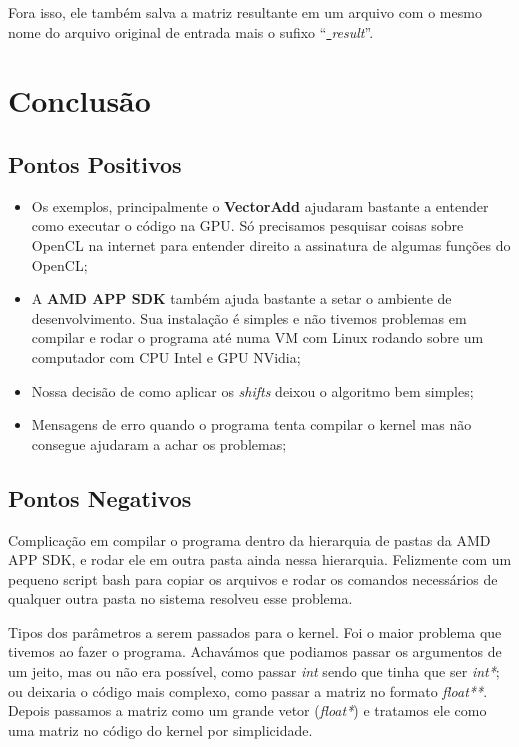 Fora isso, ele também salva a matriz resultante em um arquivo com o mesmo nome do arquivo original de entrada mais
o sufixo \textquotedblleft\textit{\underline{ }result}\textquotedblright.

\section{Conclusão}
\subsection{Pontos Positivos}
\begin{itemize}
  \item Os exemplos, principalmente o \textbf{VectorAdd} ajudaram bastante a entender como executar o código na GPU.
        Só precisamos pesquisar coisas sobre OpenCL na internet para entender direito a assinatura de algumas funções
        do OpenCL;
  \item A \textbf{AMD APP SDK} também ajuda bastante a setar o ambiente de desenvolvimento. Sua instalação é simples
        e não tivemos problemas em compilar e rodar o programa até numa VM com Linux rodando sobre um computador com
        CPU Intel e GPU NVidia;
  \item Nossa decisão de como aplicar os \textit{shifts} deixou o algoritmo bem simples;
  \item Mensagens de erro quando o programa tenta compilar o kernel mas não consegue ajudaram a achar os problemas;
\end{itemize}

\subsection{Pontos Negativos}
Complicação em compilar o programa dentro da hierarquia de pastas da AMD APP SDK, e rodar ele em outra pasta
ainda nessa hierarquia. Felizmente com um pequeno script bash para copiar os arquivos e rodar os comandos
necessários de qualquer outra pasta no sistema resolveu esse problema.

Tipos dos parâmetros a serem passados para o kernel. Foi o maior problema que tivemos ao fazer o programa. Achavámos
que podiamos passar os argumentos de um jeito, mas ou não era possível, como passar \textit{int} sendo que tinha que
ser \textit{int*}; ou deixaria o código mais complexo, como passar a matriz no formato \textit{float**}. Depois
passamos a matriz como um grande vetor (\textit{float*}) e tratamos ele como uma matriz no código do kernel por simplicidade.




